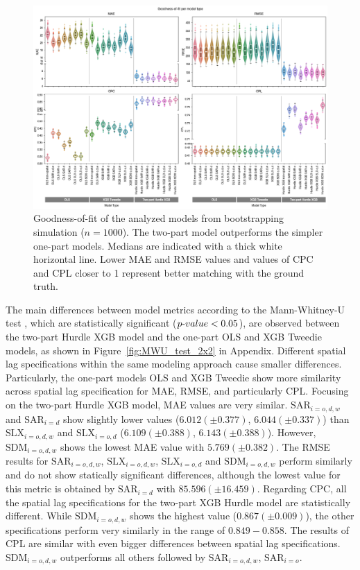 \begin{figure}[ht!]
    \centering
    \includegraphics[width=1\textwidth]{fig_all_models_goodness_of_fit_2x2_n1000.png}
    \caption{Goodness-of-fit of the analyzed models from bootstrapping simulation ($n=1000$). The two-part model outperforms the simpler one-part models. Medians are indicated with a thick white horizontal line. Lower MAE and RMSE values and values of CPC and CPL closer to 1 represent better matching with the ground truth.}
    \label{fig:boxplots_results}
\end{figure}

The main differences between model metrics according to the Mann-Whitney-U test \citep{Mann1947}, which are statistically significant ($p{\text -}value<0.05$), are observed between the two-part Hurdle XGB model and the one-part OLS and XGB Tweedie models, as shown in Figure~\ref{fig:MWU_test_2x2} in Appendix.
Different spatial lag specifications within the same modeling approach cause smaller differences. 
Particularly, the one-part models OLS and XGB Tweedie show more similarity across spatial lag specification for MAE, RMSE, and particularly CPL.
Focusing on the two-part Hurdle XGB model, MAE values are very similar. $\text{SAR}_{i=o,d,w}$ and $\text{SAR}_{i=d}$ show slightly lower values ($6.012(\pm0.377)$, $6.044(\pm0.337)$) than $\text{SLX}_{i=o,d,w}$ and $\text{SLX}_{i=o,d}$ ($6.109(\pm0.388)$, $6.143(\pm0.388)$). However, $\text{SDM}_{i=o,d,w}$ shows the lowest MAE value with $5.769(\pm0.382)$.
The RMSE results for $\text{SAR}_{i=o,d,w}$, $\text{SLX}_{i=o,d,w}$, $\text{SLX}_{i=o,d}$ and $\text{SDM}_{i=o,d,w}$ perform similarly and do not show statically significant differences, although the lowest value for this metric is obtained by $\text{SAR}_{i=d}$ with $85.596(\pm16.459)$. Regarding CPC, all the spatial lag specifications for the two-part XGB Hurdle model are statistically different. While $\text{SDM}_{i=o,d,w}$ shows the highest value ($0.867(\pm0.009)$), the other specifications perform very similarly in the range of $0.849-0.858$. The results of CPL are similar with even bigger differences between spatial lag specifications. $\text{SDM}_{i=o,d,w}$ outperforms all others followed by $\text{SAR}_{i=o,d,w}$, $\text{SAR}_{i=o}$.

